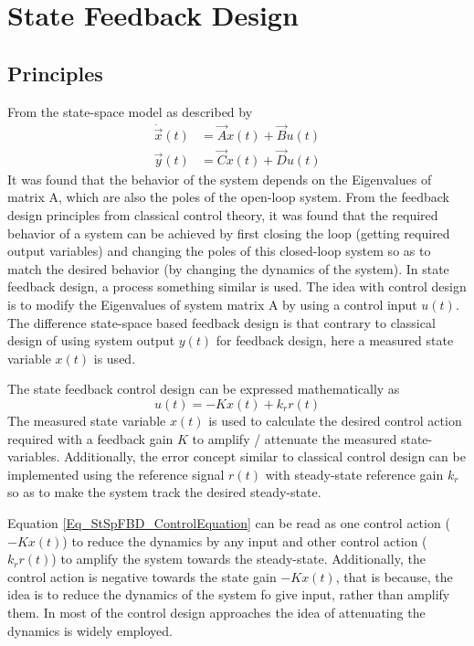 \chapter{State Feedback Design}

\section{Principles}

From the state-space model as described by
\begin{align}
\dot{\vec{x}}(t) &= \vec{A} x(t) + \vec{B} u(t) \label{Eq_StSpModel} \\
\vec{y}(t) &= \vec{C} x(t) + \vec{D} u(t)
\end{align}
It was found that the behavior of the system depends on the Eigenvalues of matrix A, which are also the poles of the open-loop system. From the feedback design principles from classical control theory, it was found that the required behavior of a system can be achieved by first closing the loop (getting required output variables) and changing the poles of this closed-loop system so as to match the desired behavior (by changing the dynamics of the system). In state feedback design, a process something similar is used. The idea with control design is to modify the Eigenvalues of system matrix A by using a control input $u(t)$. The difference state-space based feedback design is that contrary to classical design of using system output $y(t)$ for feedback design, here a measured state variable $x(t)$ is used.

The state feedback control design can be expressed mathematically as
\begin{equation}\label{Eq_StSpFBD_ControlEquation}
	u(t) = -Kx(t) + k_r r(t)
\end{equation}
The measured state variable $x(t)$ is used to calculate the desired control action required with a feedback gain $K$ to amplify / attenuate the measured state-variables. Additionally, the error concept similar to classical control design can be implemented using the reference signal $r(t)$ with steady-state reference gain $k_r$ so as to make the system track the desired steady-state.

Equation \eqref{Eq_StSpFBD_ControlEquation} can be read as one control action ($-Kx(t)$) to reduce the dynamics by any input and other control action ($k_r r(t)$) to amplify the system towards the steady-state. Additionally, the control action is negative towards the state gain $-Kx(t)$, that is because, the idea is to reduce the dynamics of the system fo give input, rather than amplify them. In most of the control design approaches the idea of attenuating the dynamics is widely employed.

